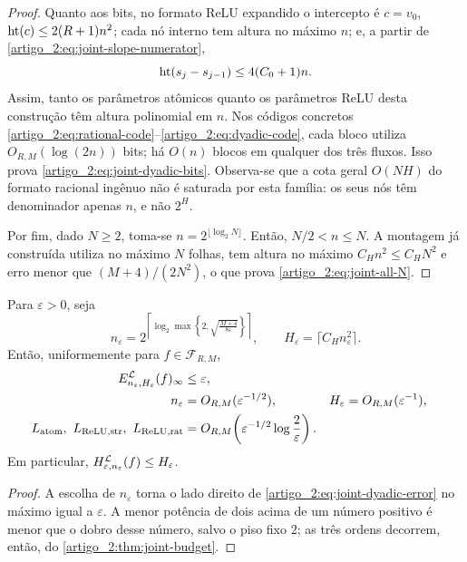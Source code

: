 \begin{proof}
Quanto aos bits, no formato ReLU expandido o intercepto é $c=v_0$,
$\operatorname{ht}(c)\le2(R+1)n^2$; cada nó interno tem altura no máximo $n$; e, a partir de
\eqref{artigo_2:eq:joint-slope-numerator},
\[
 \operatorname{ht}(s_j-s_{j-1})\le4(C_0+1)n.
\]
Assim, tanto os parâmetros atômicos quanto os parâmetros ReLU desta
construção têm altura polinomial em $n$. Nos códigos concretos
\eqref{artigo_2:eq:rational-code}--\eqref{artigo_2:eq:dyadic-code}, cada bloco utiliza
$O_{R,M}(\log(2n))$ bits; há $O(n)$ blocos em qualquer dos três fluxos. Isso
prova \eqref{artigo_2:eq:joint-dyadic-bits}. Observa-se que a cota geral
$O(NH)$ do formato racional ingênuo não é saturada por esta família: os seus
nós têm denominador apenas $n$, e não $2^H$.

Por fim, dado $N\ge2$, toma-se $n=2^{\lfloor\log_2N\rfloor}$. Então,
$N/2<n\le N$. A montagem já construída utiliza no máximo $N$ folhas, tem altura
no máximo $C_Hn^2\le C_HN^2$ e erro menor que
$(M+4)/(2N^2)$, o que prova \eqref{artigo_2:eq:joint-all-N}.
\end{proof}

\begin{corollary}\label{map:artigo_2:3.17}
\label{artigo_2:cor:height-for-epsilon}
Para $\varepsilon>0$, seja
\begin{equation}
 n_\varepsilon
 =2^{\left\lceil\log_2\max\left\{2,
        \sqrt{\frac{M+4}{8\varepsilon}}\right\}\right\rceil},
 \qquad
 H_\varepsilon=\lceil C_Hn_\varepsilon^2\rceil.
 \label{artigo_2:eq:epsilon-schedule}
\end{equation}
Então, uniformemente para $f\in\mathcal F_{R,M}$,
\begin{align}
 E_{n_\varepsilon,H_\varepsilon}^{\mathcal{L}}(f)_\infty
 &\le\varepsilon,\label{artigo_2:eq:epsilon-joint-error}\\
 n_\varepsilon&=O_{R,M}(\varepsilon^{-1/2}),
 &H_\varepsilon&=O_{R,M}(\varepsilon^{-1}),
 \label{artigo_2:eq:epsilon-joint-height}\\
 L_{\rm atom},\ L_{\rm ReLU,str},\ L_{\rm ReLU,rat}
 &=O_{R,M}\!\left(\varepsilon^{-1/2}
                   \log\frac{2}{\varepsilon}\right).
 \label{artigo_2:eq:epsilon-joint-bits}
\end{align}
Em particular,
$H_{\varepsilon,n_\varepsilon}^{\mathcal{L}}(f)\le H_\varepsilon$.
\end{corollary}

\begin{proof}
A escolha de $n_\varepsilon$ torna o lado direito de
\eqref{artigo_2:eq:joint-dyadic-error} no máximo igual a $\varepsilon$. A menor potência de
dois acima de um número positivo é menor que o dobro desse número, salvo o
piso fixo $2$; as três ordens decorrem, então, do \cref{artigo_2:thm:joint-budget}.
\end{proof}

